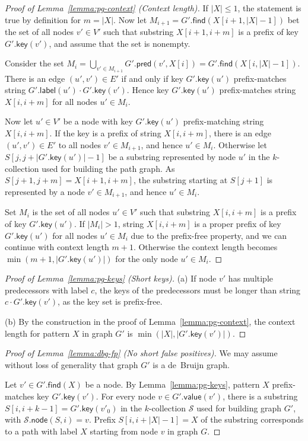 \documentclass[a4paper,11pt]{llncs}
\newcommand{\abs}[1]{\ensuremath{\lvert #1 \rvert}}
\newcommand{\find}{\ensuremath{\mathsf{find}}}
\newcommand{\glabel}{\ensuremath{\mathsf{label}}}
\newcommand{\gpred}{\ensuremath{\mathsf{pred}}}
\newcommand{\gkey}{\ensuremath{\mathsf{key}}}
\newcommand{\gvalue}{\ensuremath{\mathsf{value}}}
\newcommand{\gnode}{\ensuremath{\mathsf{node}}}
\newcommand{\kcollection}[1]{$#1$\nobreakdash-collection}
\begin{document}
\begin{proof}[Proof of Lemma~\ref{lemma:pg-context} (Context length)]
If $\abs{X} \le 1$, the statement is true by definition for $m = \abs{X}$. Now let $M_{i+1} = G'.\find(X[i+1, \abs{X}-1])$ bet the set of all nodes $v' \in V'$ such that substring $X[i+1, i+m]$ is a prefix of key $G'.\gkey(v')$, and assume that the set is nonempty.

Consider the set $M_{i} = \bigcup_{v' \in M_{i+1}} G'.\gpred(v', X[i]) = G'.\find(X[i, \abs{X}-1])$. There is an edge $(u', v') \in E'$ if and only if key $G'.\gkey(u')$ prefix-matches string $G'.\glabel(u') \cdot G'.\gkey(v')$. Hence key $G'.\gkey(u')$ prefix-matches string $X[i, i+m]$ for all nodes $u' \in M_{i}$.

Now let $u' \in V'$ be a node with key $G'.\gkey(u')$ prefix-matching string $X[i, i+m]$. If the key is a prefix of string $X[i, i+m]$, there is an edge $(u', v') \in E'$ to all nodes $v' \in M_{i+1}$, and hence $u' \in M_{i}$. Otherwise let $S[j, j+\abs{G'.\gkey(u')}-1]$ be a substring represented by node $u'$ in the \kcollection{k} used for building the path graph. As $S[j+1, j+m] = X[i+1, i+m]$, the substring starting at $S[j+1]$ is represented by a node $v' \in M_{i+1}$, and hence $u' \in M_{i}$.

Set $M_{i}$ is the set of all nodes $u' \in V'$ such that substring $X[i, i+m]$ is a prefix of key $G'.\gkey(u')$. If $\abs{M_{i}} > 1$, string $X[i, i+m]$ is a proper prefix of key $G'.\gkey(u')$ for all nodes $u' \in M_{i}$ due to the prefix-free property, and we can continue with context length $m+1$. Otherwise the context length becomes $\min(m+1, \abs{G'.\gkey(u')})$ for the only node $u' \in M_{i}$.
\end{proof}

\begin{proof}[Proof of Lemma~\ref{lemma:pg-keys} (Short keys)]
(a) If node $v'$ has multiple predecessors with label $c$, the keys of the predecessors must be longer than string $c \cdot G'.\gkey(v')$, as the key set is prefix-free.

(b) By the construction in the proof of Lemma~\ref{lemma:pg-context}, the context length for pattern $X$ in graph $G'$ is $\min(\abs{X}, \abs{G'.\gkey(v')})$.
\end{proof}

\begin{proof}[Proof of Lemma~\ref{lemma:dbg-fp} (No short false positives)]
We may assume without loss of generality that graph $G'$ is a de~Bruijn graph.

Let $v' \in G'.\find(X)$ be a node. By Lemma~\ref{lemma:pg-keys}, pattern $X$ prefix-matches key $G'.\gkey(v')$. For every node $v \in G'.\gvalue(v')$, there is a substring $S[i, i+k-1] = G'.\gkey(v'_{0})$ in the \kcollection{k} $\mathcal{S}$ used for building graph $G'$, with $\mathcal{S}.\gnode(S, i) = v$. Prefix $S[i, i+\abs{X}-1] = X$ of the substring corresponds to a path with label $X$ starting from node $v$ in graph $G$.
\end{proof}
\end{document}
